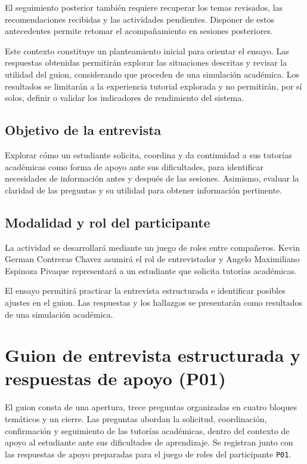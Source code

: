\documentclass[11pt,a4paper]{article}
\begin{document}
El seguimiento posterior también requiere recuperar los temas
revisados, las recomendaciones recibidas y las actividades pendientes.
Disponer de estos antecedentes permite retomar el acompañamiento
en sesiones posteriores.

Este contexto constituye un planteamiento inicial para orientar
el ensayo. Las respuestas obtenidas permitirán explorar las
situaciones descritas y revisar la utilidad del guion, considerando
que proceden de una simulación académica. Los resultados se limitarán
a la experiencia tutorial explorada y no permitirán, por sí solos,
definir o validar los indicadores de rendimiento del sistema.

\subsection{Objetivo de la entrevista}

Explorar cómo un estudiante solicita, coordina y da continuidad
a sus tutorías académicas como forma de apoyo ante sus dificultades,
para identificar necesidades de información antes y después de
las sesiones. Asimismo, evaluar la claridad de las preguntas y
su utilidad para obtener información pertinente.

\subsection{Modalidad y rol del participante}

La actividad se desarrollará mediante un juego de roles entre
compañeros. Kevin German Contreras Chavez asumirá el rol de
entrevistador y Angelo Maximiliano Espinoza Pivaque representará
a un estudiante que solicita tutorías académicas.

El ensayo permitirá practicar la entrevista estructurada e
identificar posibles ajustes en el guion. Las respuestas y
los hallazgos se presentarán como resultados de una simulación
académica.

\section{Guion de entrevista estructurada y respuestas de apoyo (P01)}

El guion consta de una apertura, trece preguntas organizadas
en cuatro bloques temáticos y un cierre. Las preguntas abordan
la solicitud, coordinación, confirmación y seguimiento de las
tutorías académicas, dentro del contexto de apoyo al estudiante
ante sus dificultades de aprendizaje. Se registran junto con las
respuestas de apoyo preparadas para el juego de roles del
participante \texttt{P01}.
\end{document}
